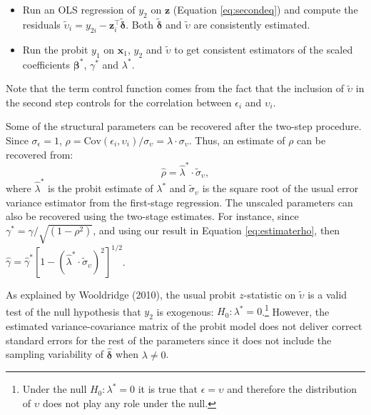 \begin{itemize}
\tightlist
\item
  Run an OLS regression of \(y_2\) on \(\mathbf z\) (Equation \eqref{eq:secondeq}) and compute the residuals \(\widetilde{\upsilon}_i = y_{2i} - \mathbf z_i^\top\widetilde{\boldsymbol \delta}\). Both \(\widetilde{\boldsymbol \delta}\) and \(\widetilde{\upsilon}\) are consistently estimated.
\item
  Run the probit \(y_1\) on \(\mathbf x_1\), \(y_2\) and \(\widetilde{\upsilon}\) to get consistent estimators of the scaled coefficients \(\boldsymbol \beta^*\), \(\gamma^*\) and \(\lambda ^*\).
\end{itemize}

Note that the term control function comes from the fact that the inclusion of \(\widetilde{\upsilon}\) in the second step controls for the correlation between \(\epsilon_i\) and \(\upsilon_i\).

Some of the structural parameters can be recovered after the two-step procedure. Since \(\sigma_{\epsilon} = 1\), \(\rho = \textrm{Cov}(\epsilon_i, \upsilon_i) / \sigma_{\upsilon} = \lambda \cdot \sigma_{\upsilon}\). Thus, an estimate of \(\rho\) can be recovered from:
\begin{equation}
\widehat{\rho} = \widehat{\lambda}^*\cdot\widetilde{\sigma}_{\upsilon},
\label{eq:estimaterho}
\end{equation}
where \(\widehat{\lambda}^*\) is the probit estimate of \(\lambda^*\) and \(\widetilde{\sigma}_{\upsilon}\) is the square root of the usual error variance estimator from the first-stage regression. The unscaled parameters can also be recovered using the two-stage estimates. For instance, since \(\gamma^* = \gamma / \sqrt{(1 - \rho^2)}\), and using our result in Equation \eqref{eq:estimaterho}, then \(\widehat{\gamma} = \widehat{\gamma}^*\left[1 - \left(\widehat{\lambda}^*\cdot\widetilde{\sigma}_{\upsilon}\right)^2\right]^{1/2}\).

As explained by Wooldridge (2010), the usual probit \(z\)-statistic on \(\widetilde{\upsilon}\) is a valid test of the null hypothesis that \(y_2\) is exogenous: \(H_0:\lambda^* = 0\).\footnote{Under the null \(H_0:\lambda^* = 0\) it is true that \(\epsilon = \upsilon\) and therefore the distribution of \(\upsilon\) does not play any role under the null.} However, the estimated variance-covariance matrix of the probit model does not deliver correct standard errors for the rest of the parameters since it does not include the sampling variability of \(\widehat{\boldsymbol \delta}\) when \(\lambda \neq 0\).

